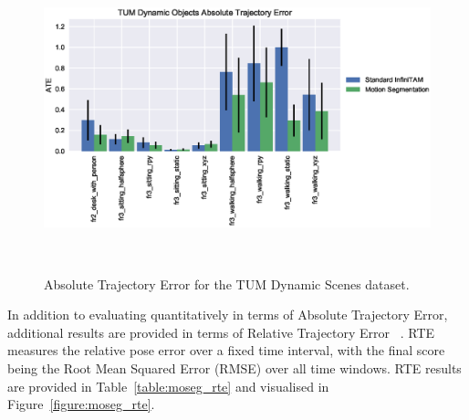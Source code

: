 \begin{figure}[!htbp]
  \centering
  \includegraphics[width=\linewidth]{figures/moseg/ate.eps}
  \caption[Motion Segmentation ATE]
  {Absolute Trajectory Error for the TUM Dynamic Scenes dataset.}
~\label{figure:moseg_ate}
\end{figure}

In addition to evaluating quantitatively in terms of Absolute Trajectory Error,
additional results are provided in terms of Relative Trajectory Error
~\cite{Sturm2012}. RTE measures the relative pose error over a fixed time
interval, with the final score being the Root Mean Squared Error (RMSE) over all 
time windows. RTE results are provided in Table~\ref{table:moseg_rte} and visualised 
in Figure~\ref{figure:moseg_rte}.

